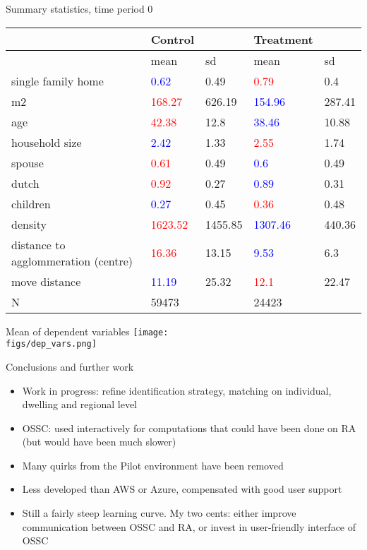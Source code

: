\documentclass[final, 12pt, aspectratio=169, xcolor={dvipsnames}]{beamer}
\newcommand*{\figs}{../figs}%
\begin{document}
\begin{frame}{Summary statistics, time period 0}
  \vspace{-0.7cm}
\begin{table}[ht]
\centering
\begin{tabular}{lllll}
  \hline
 & Control &  & Treatment &  \\ 
  \hline
 & mean & sd & mean & sd \\ 
  single family home & 	\textcolor{blue}{0.62} & 0.49 & 	\textcolor{red}{0.79} & 0.4 \\ 
  m2 & 	\textcolor{red}{168.27} & 626.19 & 	\textcolor{blue}{154.96} & 287.41 \\ 
  age & 	\textcolor{red}{42.38} & 12.8 & 	\textcolor{blue}{38.46} & 10.88 \\ 
  household size & 	\textcolor{blue}{2.42} & 1.33 & 	\textcolor{red}{2.55} & 1.74 \\ 
  spouse & 	\textcolor{red}{0.61} & 0.49 & 	\textcolor{blue}{0.6} & 0.49 \\ 
  dutch & 	\textcolor{red}{0.92} & 0.27 & 	\textcolor{blue}{0.89} & 0.31 \\ 
  children & 	\textcolor{blue}{0.27} & 0.45 & 	\textcolor{red}{0.36} & 0.48 \\ 
  density & 	\textcolor{red}{1623.52} & 1455.85 & 	\textcolor{blue}{1307.46} & 440.36 \\
    distance to agglommeration (centre) & 	\textcolor{red}{16.36} & 13.15 & 	\textcolor{blue}{9.53} & 6.3 \\ 
  move distance & 	\textcolor{blue}{11.19} & 25.32 & 	\textcolor{red}{12.1} & 22.47 \\ 
  N & 59473 &  & 24423 &  \\ 
   \hline
\end{tabular}
\end{table}  
\end{frame}

\begin{frame}{Mean of dependent variables}
  \centering
  \texttt{[image: \\figs/dep\_vars.png]}
 \end{frame}


\begin{frame}{Conclusions and further work}
  \begin{itemize}
  \item Work in progress: refine identification strategy, matching on individual, dwelling and regional level
    \item OSSC: used interactively for computations that could have been done on RA (but would have been much slower) 
  \item Many quirks from the Pilot environment have been removed
  \item Less developed than AWS or Azure, compensated with good user support
    \item Still a fairly steep learning curve. My two cents: either improve communication between OSSC and RA, or invest in user-friendly interface of OSSC
    \end{itemize}
\end{frame}
\end{document}
